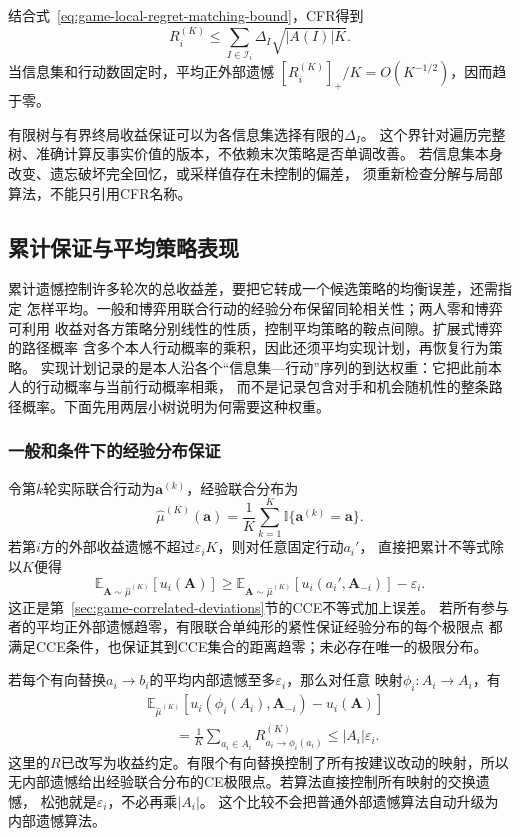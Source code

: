 结合式~\eqref{eq:game-local-regret-matching-bound}，CFR得到
\begin{equation}
  R_i^{(K)}
  \leq
  \sum_{I\in\mathcal{I}_i}
  \Delta_I\sqrt{|A(I)|K}.
  \label{eq:game-cfr-rate}
\end{equation}
当信息集和行动数固定时，平均正外部遗憾
\([R_i^{(K)}]_+/K=O(K^{-1/2})\)，因而趋于零。

有限树与有界终局收益保证可以为各信息集选择有限的\(\Delta_I\)。
这个界针对遍历完整树、准确计算反事实价值的版本，不依赖末次策略是否单调改善。
若信息集本身改变、遗忘破坏完全回忆，或采样值存在未控制的偏差，
须重新检查分解与局部算法，不能只引用CFR名称。

\subsection{累计保证与平均策略表现}
\label{sec:game-regret-average-guarantees}

累计遗憾控制许多轮次的总收益差，要把它转成一个候选策略的均衡误差，还需指定
怎样平均。一般和博弈用联合行动的经验分布保留同轮相关性；两人零和博弈可利用
收益对各方策略分别线性的性质，控制平均策略的鞍点间隙。扩展式博弈的路径概率
含多个本人行动概率的乘积，因此还须平均实现计划，再恢复行为策略。
实现计划记录的是本人沿各个“信息集—行动”序列的到达权重：它把此前本人的行动概率与当前行动概率相乘，
而不是记录包含对手和机会随机性的整条路径概率。下面先用两层小树说明为何需要这种权重。

\subsubsection{一般和条件下的经验分布保证}
\label{sec:game-empirical-equilibrium}

令第\(k\)轮实际联合行动为\(\bm a^{(k)}\)，经验联合分布为
\[
  \widehat\mu^{(K)}(\bm a)
  =\frac1K\sum_{k=1}^K\mathbb I\{\bm a^{(k)}=\bm a\}.
\]
若第\(i\)方的外部收益遗憾不超过\(\varepsilon_iK\)，则对任意固定行动\(a_i'\)，
直接把累计不等式除以\(K\)便得
\[
  \mathbb E_{\bm A\sim\widehat\mu^{(K)}}[u_i(\bm A)]
  \geq
  \mathbb E_{\bm A\sim\widehat\mu^{(K)}}
     [u_i(a_i',\bm A_{-i})]-\varepsilon_i.
\]
这正是第~\ref{sec:game-correlated-deviations}节的CCE不等式加上误差。
若所有参与者的平均正外部遗憾趋零，有限联合单纯形的紧性保证经验分布的每个极限点
都满足CCE条件，也保证其到CCE集合的距离趋零；未必存在唯一的极限分布。

若每个有向替换\(a_i\to b_i\)的平均内部遗憾至多\(\varepsilon_i\)，那么对任意
映射\(\phi_i:A_i\to A_i\)，有
\[
  \begin{aligned}
    &\mathbb E_{\widehat\mu^{(K)}}[
       u_i(\phi_i(A_i),\bm A_{-i})-u_i(\bm A)]\\
    &\qquad=\frac1K\sum_{a_i\in A_i}R_{a_i\to\phi_i(a_i)}^{(K)}
      \leq |A_i|\varepsilon_i.
  \end{aligned}
\]
这里的\(R\)已改写为收益约定。有限个有向替换控制了所有按建议改动的映射，所以
无内部遗憾给出经验联合分布的CE极限点。若算法直接控制所有映射的交换遗憾，
松弛就是\(\varepsilon_i\)，不必再乘\(|A_i|\)。
这个比较不会把普通外部遗憾算法自动升级为内部遗憾算法。

